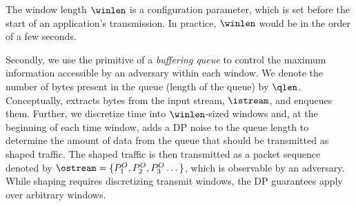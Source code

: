 The window length $\winlen$ is a configuration parameter, which is set before
the start of an application's transmission. In practice,
$\winlen$ would be in the order of a few seconds.

Secondly, we use the primitive of a {\em buffering queue} to control the
maximum information accessible by an adversary within each window. We denote the
number of bytes present in the queue (\ie length of the queue) by $\qlen$.
Conceptually, {\sys} extracts bytes from the input stream, $\istream$, and
enqueues them.
{Further, we discretize time into $\winlen$-sized windows and, at the
beginning of each time window, {\sys} adds a DP noise to the queue
length to determine the amount of data from the queue that should be transmitted
as shaped traffic.}
The shaped traffic is then transmitted as a packet sequence denoted by $\ostream
= \{{P^O_1}, {P^O_2}, {P^O_3} \dots \}$, which is observable by an adversary.
{While shaping requires discretizing transmit windows, the DP guarantees
apply over arbitrary windows.}

